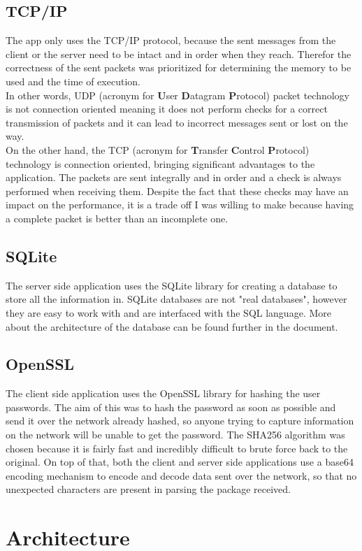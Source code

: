 \documentclass[runningheads, a4paper]{llncs}
\begin{document}
\subsection{TCP/IP}
The app only uses the TCP/IP protocol, because the sent messages from the client or the server need to be intact and in order when they reach. Therefor the correctness of the sent packets was prioritized for determining the memory to be used and the time of execution.\\
In other words, UDP (acronym for \textbf{U}ser \textbf{D}atagram  \textbf{P}rotocol) packet technology is not connection oriented meaning it does not perform checks for a correct transmission of packets and it can lead to incorrect messages sent or lost on the way.\\
On the other hand, the TCP (acronym for \textbf{T}ransfer \textbf{C}ontrol \textbf{P}rotocol)  technology is connection oriented, bringing significant advantages to the application. The packets are sent integrally and in order and a check is always performed when receiving them. Despite the fact that these checks may have an impact on the performance, it is a trade off I was willing to make because having a complete packet is better than an incomplete one.
\subsection{SQLite}
The server side application uses the SQLite library for creating a database to store all the information in. SQLite databases are not "real databases", however they are easy to work with and are interfaced with the SQL language. More about the architecture of the database can be found further in the document.
\subsection{OpenSSL}
The client side application uses the OpenSSL library for hashing the user passwords. The aim of this was to hash the password as soon as possible and send it over the network already hashed, so anyone trying to capture information on the network will be unable to get the password. The SHA256 algorithm was chosen because it is fairly fast and incredibly difficult to brute force back to the original.  On top of that, both the client and server side applications use a base64 encoding mechanism to encode and decode data sent over the network, so that no unexpected characters are present in parsing the package received.
\section{Architecture}
\end{document}
